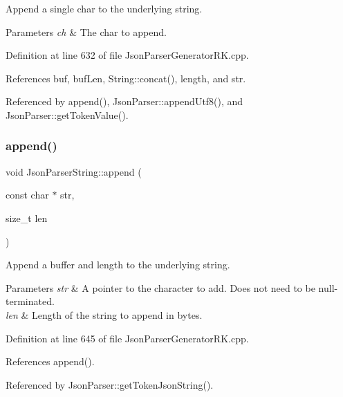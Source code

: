 Append a single char to the underlying string. 


\begin{DoxyParams}{Parameters}
{\em ch} & The char to append. \\
\hline
\end{DoxyParams}


Definition at line 632 of file Json\+Parser\+Generator\+R\+K.\+cpp.



References buf, buf\+Len, String\+::concat(), length, and str.



Referenced by append(), Json\+Parser\+::append\+Utf8(), and Json\+Parser\+::get\+Token\+Value().

\mbox{\label{class_json_parser_string_a28e2858fe1481e20fa8bc40054378c9f}} 
\subsubsection{\texorpdfstring{append()}{append()}\hspace{0.1cm}{\footnotesize\ttfamily [2/2]}}
{\footnotesize\ttfamily void Json\+Parser\+String\+::append (\begin{DoxyParamCaption}\item[{const char $\ast$}]{str,  }\item[{size\+\_\+t}]{len }\end{DoxyParamCaption})}



Append a buffer and length to the underlying string. 


\begin{DoxyParams}{Parameters}
{\em str} & A pointer to the character to add. Does not need to be null-\/terminated.\\
\hline
{\em len} & Length of the string to append in bytes. \\
\hline
\end{DoxyParams}


Definition at line 645 of file Json\+Parser\+Generator\+R\+K.\+cpp.



References append().



Referenced by Json\+Parser\+::get\+Token\+Json\+String().

